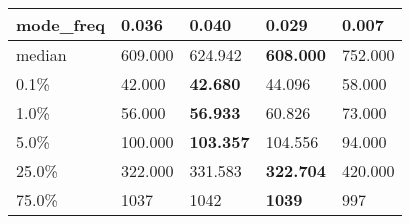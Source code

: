 \begin{table}[H]
\begin{tabular}{|l|m{10em}|m{10em}|m{10em}|m{10em}|}
\hline mode\_freq & 0.036 & \bfseries 0.040 & 0.029 & \cellcolor[rgb]{0.9, 0.54, 0.52} 0.007 \\
\hline median & 609.000 & 624.942 & \bfseries 608.000 & \cellcolor[rgb]{0.9, 0.54, 0.52} 752.000 \\
\hline 0.1\% & 42.000 & \bfseries 42.680 & 44.096 & \cellcolor[rgb]{0.9, 0.54, 0.52} 58.000 \\
\hline 1.0\% & 56.000 & \bfseries 56.933 & 60.826 & \cellcolor[rgb]{0.9, 0.54, 0.52} 73.000 \\
\hline 5.0\% & 100.000 & \bfseries 103.357 & 104.556 & \cellcolor[rgb]{0.9, 0.54, 0.52} 94.000 \\
\hline 25.0\% & 322.000 & 331.583 & \bfseries 322.704 & \cellcolor[rgb]{0.9, 0.54, 0.52} 420.000 \\
\hline 75.0\% & 1037 & 1042 & \bfseries 1039 & \cellcolor[rgb]{0.9, 0.54, 0.52} 997 \\
\hline
\end{tabular}
\end{table}
